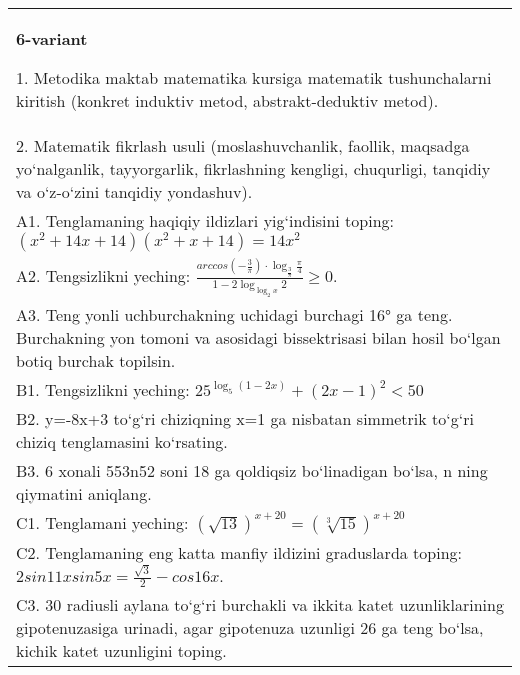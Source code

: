 \documentclass{article}
\begin{document}
\begin{tabular}{m{17cm}}
\textbf{6-variant}

1. Metodika maktab matematika kursiga matematik tushunchalarni kiritish (konkret induktiv metod, abstrakt-deduktiv metod). \\
2. Matematik fikrlash usuli (moslashuvchanlik, faollik, maqsadga yo‘nalganlik, tayyorgarlik, fikrlashning kengligi, chuqurligi, tanqidiy va o‘z-o‘zini tanqidiy yondashuv). \\
A1. Tenglamaning haqiqiy ildizlari yig‘indisini toping: \((x^2 + 14x + 14) (x^2 + x + 14) = 14x^2\) \\
A2. Tengsizlikni yeching: \(\frac{arccos (- \frac{3}{\pi}) \cdot \log_{\frac{3}{\pi}}\frac{\pi}{4}}{1 - 2\log_{\log_{2}x}2} \geq 0\). \\
A3. Teng yonli uchburchakning uchidagi burchagi 16° ga teng. Burchakning yon tomoni va asosidagi bissektrisasi bilan hosil bo‘lgan botiq burchak topilsin. \\
B1. Tengsizlikni yeching: \(25^{\log_{5}{ (1 - 2x) }} + { (2x - 1) }^{2} < 50\) \\
B2. y=-8x+3 to‘g‘ri chiziqning x=1 ga nisbatan simmetrik to‘g‘ri chiziq tenglamasini ko‘rsating. \\
B3. 6 xonali 553n52 soni 18 ga qoldiqsiz bo‘linadigan bo‘lsa, n ning qiymatini aniqlang. \\
C1. Tenglamani yeching: \((\sqrt{13}) ^{x + 20} = (\sqrt[3]{15}) ^{x + 20}\) \\
C2. Tenglamaning eng katta manfiy ildizini graduslarda toping: \(2sin11xsin5x = \frac{\sqrt{3}}{2} - cos16x\). \\
C3. 30 radiusli aylana to‘g‘ri burchakli va ikkita katet uzunliklarining gipotenuzasiga urinadi, agar gipotenuza uzunligi 26 ga teng bo‘lsa, kichik katet uzunligini toping. \\

\end{tabular}
\vspace{1cm}
\end{document}
